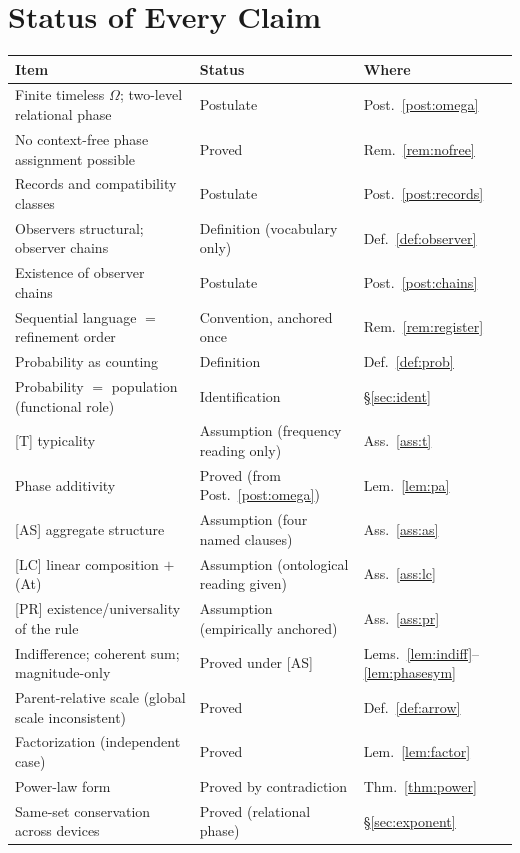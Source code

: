 \documentclass[11pt]{article}
\theoremstyle{definition}
\theoremstyle{remark}
\begin{document}
\section{Status of Every Claim}\label{sec:ledger}
\begin{center}
\begin{tabular}{@{}lll@{}}
\toprule
Item & Status & Where\\
\midrule
Finite timeless $\Omega$; two-level relational phase & Postulate & Post.~\ref{post:omega}\\
No context-free phase assignment possible & Proved & Rem.~\ref{rem:nofree}\\
Records and compatibility classes & Postulate & Post.~\ref{post:records}\\
Observers structural; observer chains & Definition (vocabulary only) & Def.~\ref{def:observer}\\
Existence of observer chains & Postulate & Post.~\ref{post:chains}\\
Sequential language $=$ refinement order & Convention, anchored once & Rem.~\ref{rem:register}\\
Probability as counting & Definition & Def.~\ref{def:prob}\\
Probability $=$ population (functional role) & Identification & \S\ref{sec:ident}\\
{[T]} typicality & Assumption (frequency reading only) & Ass.~\ref{ass:t}\\
Phase additivity & Proved (from Post.~\ref{post:omega}) & Lem.~\ref{lem:pa}\\
{[AS]} aggregate structure & Assumption (four named clauses) & Ass.~\ref{ass:as}\\
{[LC]} linear composition $+$ (At) & Assumption (ontological reading given) & Ass.~\ref{ass:lc}\\
{[PR]} existence/universality of the rule & Assumption (empirically anchored) & Ass.~\ref{ass:pr}\\
Indifference; coherent sum; magnitude-only & Proved under [AS] & Lems.~\ref{lem:indiff}--\ref{lem:phasesym}\\
Parent-relative scale (global scale inconsistent) & Proved & Def.~\ref{def:arrow}\\
Factorization (independent case) & Proved & Lem.~\ref{lem:factor}\\
Power-law form & Proved by contradiction & Thm.~\ref{thm:power}\\
Same-set conservation across devices & Proved (relational phase) & \S\ref{sec:exponent}\\

\end{tabular}
\end{center}
\end{document}
